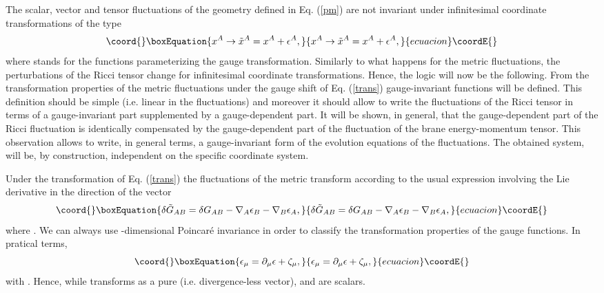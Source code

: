 \documentclass[a4paper,12pt]{article}
\begin{document}
The scalar, vector and tensor fluctuations of the geometry defined in 
Eq. (\ref{pm}) are not invariant under infinitesimal coordinate 
transformations of the type 
\begin{equation}\coord{}\boxEquation{
x^{A} \rightarrow \tilde{x}^{A} = x^{A} + \epsilon^{A},
\label{trans}
}{
x^{A} \rightarrow \tilde{x}^{A} = x^{A} + \epsilon^{A},
}{ecuacion}\coordE{}\end{equation}
where \coordHE{} stands for the \coordHE{} functions 
parameterizing the gauge transformation.
Similarly to what happens for the metric 
fluctuations, the perturbations of the Ricci tensor change 
for infinitesimal coordinate transformations. 
Hence, the logic will now be the following.
 From the  transformation properties of 
the metric fluctuations under the gauge shift of Eq. (\ref{trans}) 
gauge-invariant functions will be defined. This definition 
should be simple (i.e. linear in the fluctuations) and moreover 
it should allow to write the fluctuations 
of the Ricci tensor in terms of a gauge-invariant part supplemented 
by a gauge-dependent part. It will be shown, in general, that 
the gauge-dependent part of the Ricci fluctuation is identically 
  compensated by the gauge-dependent part of the fluctuation of the 
brane energy-momentum tensor. This observation allows to 
write, in general terms, a gauge-invariant form of the 
evolution equations of the 
fluctuations. The obtained system, will be, by construction, 
independent on the specific coordinate system.


Under the transformation of Eq. (\ref{trans}) the 
fluctuations of the metric transform according to the 
usual expression involving the Lie derivative in the direction 
of the vector \coordHE{}
\begin{equation}\coord{}\boxEquation{
\delta \tilde{G}_{A B} = \delta G_{AB} - \nabla_{A} \epsilon_{B} - \nabla_{B}
\epsilon_{A},
\label{liederiv}
}{
\delta \tilde{G}_{A B} = \delta G_{AB} - \nabla_{A} \epsilon_{B} - \nabla_{B}
\epsilon_{A},
}{ecuacion}\coordE{}\end{equation}
where \coordHE{}. We can always 
use \coordHE{}-dimensional Poincar\'e invariance in order to 
classify the transformation properties of the gauge functions. In pratical 
terms, 
\begin{equation}\coord{}\boxEquation{
\epsilon_{\mu} = \partial_{\mu} \epsilon + \zeta_{\mu},
}{
\epsilon_{\mu} = \partial_{\mu} \epsilon + \zeta_{\mu},
}{ecuacion}\coordE{}\end{equation}
with \coordHE{}. Hence, while \myHighlight{$\zeta_{\mu}$}\coordHE{} 
transforms as a pure (i.e. divergence-less vector), \myHighlight{$\epsilon $}\coordHE{} and 
\coordHE{} are scalars.
\end{document}
